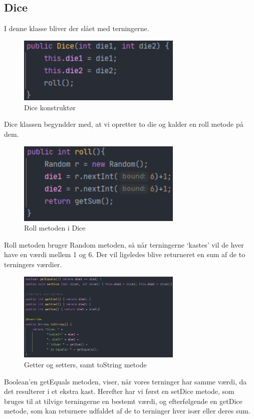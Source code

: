 \subsection{Dice }
I denne klasse bliver der slået med terningerne.
\begin{figure}[H]
    \centering
    \includegraphics[width=0.7\textwidth]{sources/7_implementering/Dice.PNG}
    \caption{Dice konstruktør}
    \label{fig:DiceKons}
\end{figure}
Dice klassen begyndder med, at vi opretter to die og kalder en roll metode på dem.
\begin{figure}[H]
    \centering
    \includegraphics[width=0.7\textwidth]{sources/7_implementering/Roll.PNG}
    \caption{Roll metoden i Dice}
    \label{fig:diceRoll}
\end{figure}
Roll metoden bruger Random metoden, så når terningerne ‘kastes’ vil de hver have en værdi mellem 1 og 6. Der vil ligeledes blive returneret en sum af de to terningers værdier.
\begin{figure}[H]
    \centering
    \includegraphics[width=0.7\textwidth]{sources/7_implementering/equal.PNG}
    \caption{Getter og setters, samt toString metode}
    \label{fig:Dicemisc}
\end{figure}
Boolean'en getEquals metoden, viser, når vores terninger har samme værdi, da det resulterer i et ekstra kast.
Herefter har vi først en setDice metode, som bruges til at tilvige terningerne en bestemt værdi, og efterfølgende en getDice metode, som kan returnere udfaldet af de to terninger hver især eller deres sum.

